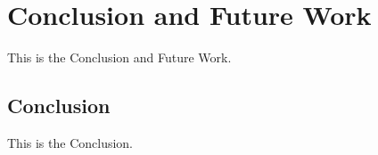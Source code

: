 \chapter{Conclusion and Future Work}
This is the Conclusion and Future Work.

\section{Conclusion}
This is the Conclusion.